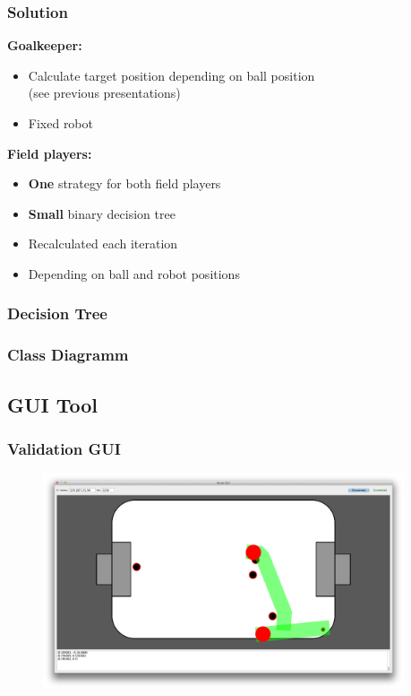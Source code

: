 \documentclass[hyperref={pdfpagelabels=false},compress]{beamer}
\begin{document}
\begin{frame}
    \frametitle{Solution}
    \textbf{Goalkeeper:}\\
    \begin{itemize}
        \item Calculate target position depending on ball position\\
        (see previous presentations)
        \item Fixed robot
    \end{itemize}

    \textbf{Field players:}\\
    \begin{itemize}
        \item \textbf{One} strategy for both field players
        \item \textbf{Small} binary decision tree
        \item Recalculated each iteration
        \item Depending on ball and robot positions
    \end{itemize}

\end{frame}

\begin{frame}
    \frametitle{Decision Tree}
    \begin{center}
        
    \end{center}
\end{frame}

\begin{frame}
    \frametitle{Class Diagramm}
    \begin{center}
        
    \end{center}
\end{frame}

\subsection{GUI Tool}
\begin{frame}
    \frametitle{Validation GUI}
    \begin{figure}
        \center
        \includegraphics[width=0.95\textwidth]{Pictures/gui-big}
    \end{figure}

\end{frame}
\end{document}
